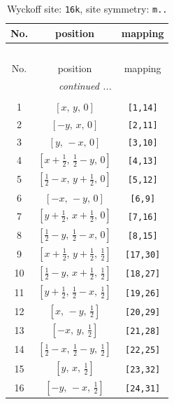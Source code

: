 \documentclass[fleqn,8pt]{jsarticle}
\begin{document}
\renewcommand{\arraystretch}{1.2}
\begin{longtable}{ccc}
\caption{Wyckoff site: {\tt 16k}, site symmetry: {\tt m..}}
 \\
 \hline \hline
No. & position & mapping \\ \hline \endfirsthead

\multicolumn{2}{l}{\tablename\ \thetable{}} \\
 \hline \hline
No. & position & mapping \\ \hline \endhead

 \hline \hline
\multicolumn{2}{r}{\footnotesize\it continued ...} \\ \endfoot

 \hline \hline
\multicolumn{2}{r}{} \\ \endlastfoot

1 & $\left[ x,\, y,\, 0 \right]$ & {\tt [1,14]} \\ \hline
2 & $\left[ - y,\, x,\, 0 \right]$ & {\tt [2,11]} \\ \hline
3 & $\left[ y,\, - x,\, 0 \right]$ & {\tt [3,10]} \\ \hline
4 & $\left[ x + \frac{1}{2},\, \frac{1}{2} - y,\, 0 \right]$ & {\tt [4,13]} \\ \hline
5 & $\left[ \frac{1}{2} - x,\, y + \frac{1}{2},\, 0 \right]$ & {\tt [5,12]} \\ \hline
6 & $\left[ - x,\, - y,\, 0 \right]$ & {\tt [6,9]} \\ \hline
7 & $\left[ y + \frac{1}{2},\, x + \frac{1}{2},\, 0 \right]$ & {\tt [7,16]} \\ \hline
8 & $\left[ \frac{1}{2} - y,\, \frac{1}{2} - x,\, 0 \right]$ & {\tt [8,15]} \\ \hline
9 & $\left[ x + \frac{1}{2},\, y + \frac{1}{2},\, \frac{1}{2} \right]$ & {\tt [17,30]} \\ \hline
10 & $\left[ \frac{1}{2} - y,\, x + \frac{1}{2},\, \frac{1}{2} \right]$ & {\tt [18,27]} \\ \hline
11 & $\left[ y + \frac{1}{2},\, \frac{1}{2} - x,\, \frac{1}{2} \right]$ & {\tt [19,26]} \\ \hline
12 & $\left[ x,\, - y,\, \frac{1}{2} \right]$ & {\tt [20,29]} \\ \hline
13 & $\left[ - x,\, y,\, \frac{1}{2} \right]$ & {\tt [21,28]} \\ \hline
14 & $\left[ \frac{1}{2} - x,\, \frac{1}{2} - y,\, \frac{1}{2} \right]$ & {\tt [22,25]} \\ \hline
15 & $\left[ y,\, x,\, \frac{1}{2} \right]$ & {\tt [23,32]} \\ \hline
16 & $\left[ - y,\, - x,\, \frac{1}{2} \right]$ & {\tt [24,31]} \\
\end{longtable}
\end{document}

